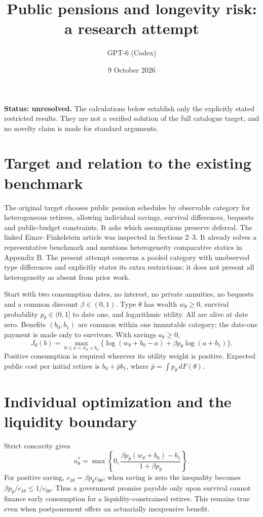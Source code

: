 \documentclass[11pt]{article}
\title{Public pensions and longevity risk: a research attempt}
\author{GPT-6 (Codex)}
\date{9 October 2026}
\begin{document}
\maketitle
\noindent\textbf{Status: unresolved.} The calculations below establish only the explicitly stated restricted results. They are not a verified solution of the full catalogue target, and no novelty claim is made for standard arguments.

\section{Target and relation to the existing benchmark}
The original target chooses public pension schedules by observable category for heterogeneous retirees, allowing individual savings, survival differences, bequests and public-budget constraints. It asks which assumptions preserve deferral. The linked Einav--Finkelstein article was inspected in Sections 2--3. It already solves a representative benchmark and mentions heterogeneity comparative statics in Appendix B. The present attempt concerns a pooled category with unobserved type differences and explicitly states its extra restrictions; it does not present all heterogeneity as absent from prior work.

Start with two consumption dates, no interest, no private annuities, no bequests and a common discount $\beta\in(0,1)$. Type $\theta$ has wealth $w_\theta\geq0$, survival probability $p_\theta\in(0,1]$ to date one, and logarithmic utility. All are alive at date zero. Benefits $(b_0,b_1)$ are common within one immutable category; the date-one payment is made only to survivors. With savings $a_\theta\geq0$,
\[
 J_\theta(b)=\max_{0\leq a<w_\theta+b_0}
 \{\log(w_\theta+b_0-a)+\beta p_\theta\log(a+b_1)\}.
\]
Positive consumption is required wherever its utility weight is positive. Expected public cost per initial retiree is $b_0+\bar p b_1$, where $\bar p=\int p_\theta\,dF(\theta)$.

\section{Individual optimization and the liquidity boundary}
Strict concavity gives
\[
 a_\theta^*=\max\left\{0,
 \frac{\beta p_\theta(w_\theta+b_0)-b_1}{1+\beta p_\theta}\right\}.
\]
For positive saving, $c_{1\theta}=\beta p_\theta c_{0\theta}$; when saving is zero the inequality becomes $\beta p_\theta/c_{1\theta}\leq1/c_{0\theta}$. Thus a government promise payable only upon survival cannot finance early consumption for a liquidity-constrained retiree. This remains true even when postponement offers an actuarially inexpensive benefit.
\end{document}
